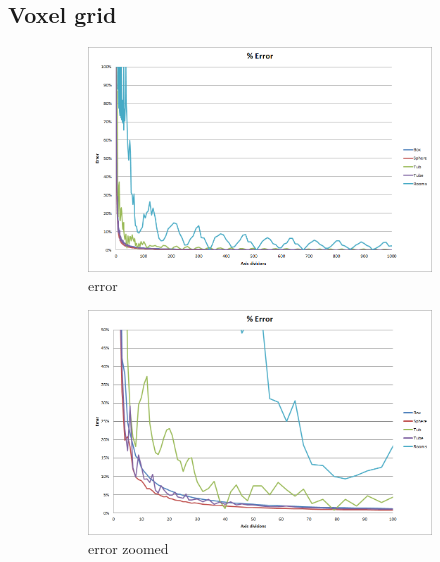 \documentclass[11pt,twoside,a4paper]{report}
\begin{document}
\subsection{Voxel grid}
\begin{figure}[h] \centering 
	\begin{subfigure}[h]{0.49\textwidth} 
	\includegraphics[width=\textwidth]{images/chart_voxel_error}
	\caption{error} \label{fig:voxel error} \end{subfigure}
    \begin{subfigure}[h]{0.49\textwidth}
	\includegraphics[width=\textwidth]{images/chart_voxel_error_zoomed}
    \caption{error zoomed} \label{fig:voxel error zoomed} \end{subfigure}
    \begin{subfigure}[h]{0.49\textwidth}

\end{subfigure}
\end{figure}
\end{document}
